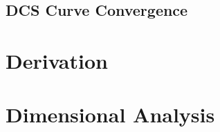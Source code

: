 \documentclass{article}
\begin{document}
\begin{figure}[h]
  \begin{center}
    
  \end{center}
  \caption[Positron DCS Curves]{
  }
  \label{fig:pos-dcs-curves}
\end{figure}

\clearpage

\subsection{DCS Curve Convergence}
\label{sec:dcs-curve-conv}

\begin{figure}[h]
  \begin{center}
    
  \end{center}
  \caption[Convergence of DCS Curves]{
  }
  \label{fig:convergence-dcs-curves}
\end{figure}

\clearpage

\section{Derivation}
\label{sec:derivation}

\section{Dimensional Analysis}
\label{sec:dimensional-analysis}
\end{document}
